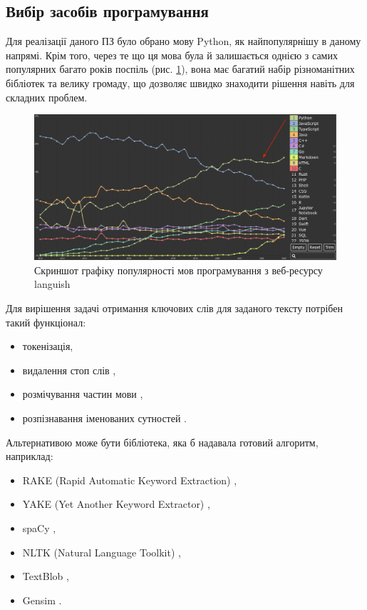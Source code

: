 \documentclass[14pt]{extarticle}
\begin{document}
  \newpage

  \subsection{Вибір засобів програмування}
  Для реалізації даного ПЗ було обрано мову Python,
  як найпопулярнішу в даному напрямі.
  Крім того,
  через те що ця мова була й залишається однією
  з самих популярних багато років поспіль
  \cite{tiobe_index, pypl, github_octoverse2022, languish}
  (рис. \ref{fig:python_languish}),
  вона має багатий набір різноманітних бібліотек та велику громаду,
  що дозволяє швидко знаходити рішення навіть для складних проблем.

  \begin{figure}[H]
    \centering
    \includegraphics[width=\textwidth]{languish_python.png}    
    \captionsetup{justification=centering}  
    \caption{Скриншот графіку популярності мов програмування
    з веб-ресурсу languish}
    \label{fig:python_languish}
  \end{figure}

  Для вирішення задачі отримання ключових слів для заданого тексту
  потрібен такий функціонал:
  \begin{itemize}[labelindent=\dimexpr{}\relax, leftmargin=*]
    \item токенізація,
    \item видалення стоп слів \cite{wiki_stop_word},
    \item розмічування частин мови \cite{wiki_pos_tagging},
    \item розпізнавання іменованих сутностей \cite{wiki_ner}.
  \end{itemize}

  Альтернативою може бути бібліотека, яка б надавала готовий алгоритм,
  наприклад:
  \begin{itemize}[labelindent=\dimexpr{}\relax, leftmargin=*]
    \item RAKE (Rapid Automatic Keyword Extraction) \cite{rake_nltk},
    \item YAKE (Yet Another Keyword Extractor) \cite{pypi_yake},
    \item spaCy \cite{spaCy},
    \item NLTK (Natural Language Toolkit) \cite{nltk},
    \item TextBlob \cite{TextBlob},
    \item Gensim \cite{gensim}.
  \end{itemize}
\end{document}

